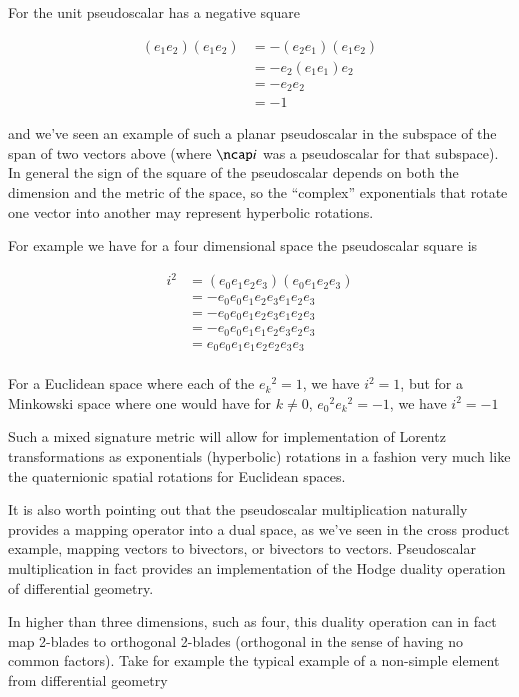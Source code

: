 \documentclass{article}
\begin{document}
For  the unit pseudoscalar has a negative square

\begin{align*}
(e_1 e_2) (e_1 e_2)
&=
- (e_2 e_1) (e_1 e_2) \\
&=
- e_2 (e_1 e_1) e_2 \\
&=
- e_2 e_2 \\
&=
-1
\end{align*}

and we've seen an example of such a planar pseudoscalar in the subspace of the span of two vectors above (where $\ncap i$ was a pseudoscalar
for that subspace).  In general the sign of the square of the pseudoscalar depends on both the dimension and the metric of the space, 
so the ``complex'' exponentials that rotate one vector into another may represent hyperbolic rotations.

For example we have for a four dimensional space the pseudoscalar square is

\begin{align*}
i^2 &=
(e_0 e_1 e_2 e_3) (e_0 e_1 e_2 e_3) \\
&=
- e_0 e_0 e_1 e_2 e_3 e_1 e_2 e_3 \\
&=
- e_0 e_0 e_1 e_2 e_3 e_1 e_2 e_3 \\
&=
- e_0 e_0 e_1 e_1 e_2 e_3 e_2 e_3 \\
&=
e_0 e_0 e_1 e_1 e_2 e_2 e_3 e_3 \\
\end{align*}

For a Euclidean space where each of the ${e_k}^2 = 1$, we have $i^2 = 1$, but for a Minkowski space where one would have for $k\ne0$, ${e_0}^2 {e_k}^2 = -1$, we have $i^2 = -1$

Such a mixed signature metric will allow for implementation of Lorentz transformations as exponentials (hyperbolic) rotations
in a fashion very much like the quaternionic spatial rotations for Euclidean spaces.

It is also worth pointing out that the pseudoscalar multiplication naturally provides a mapping operator into a dual space, as we've seen 
in the cross product example, mapping vectors to bivectors, or bivectors to vectors.  Pseudoscalar multiplication in fact provides an 
implementation of the Hodge duality operation of differential geometry.

In higher than three dimensions, such as four, this duality operation can in fact map 2-blades to orthogonal 2-blades (orthogonal in the sense
of having no common factors).  Take for example the typical example of a non-simple element from differential geometry
\end{document}
